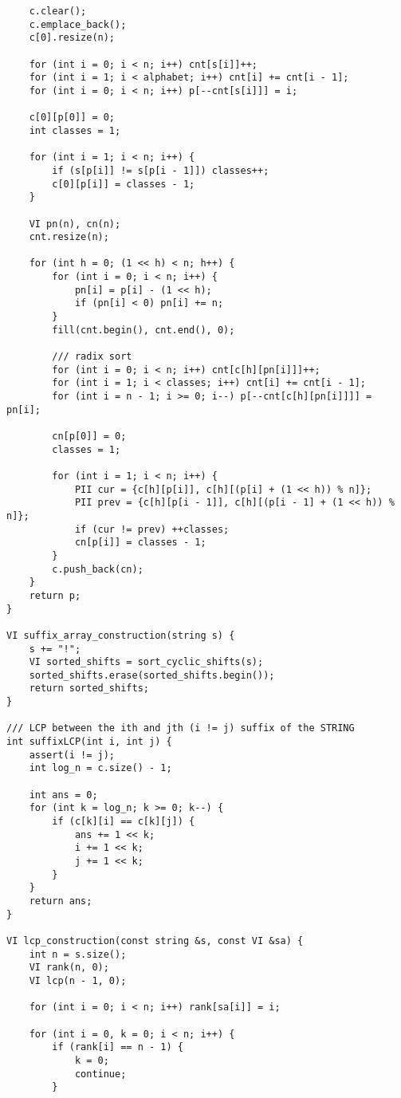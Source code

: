\documentclass[FSZ,a4paper,onesided]{article}
\begin{document}
\begin{multicols*}{\COLS}
\begin{lstlisting}
    c.clear();
    c.emplace_back();
    c[0].resize(n);

    for (int i = 0; i < n; i++) cnt[s[i]]++;
    for (int i = 1; i < alphabet; i++) cnt[i] += cnt[i - 1];
    for (int i = 0; i < n; i++) p[--cnt[s[i]]] = i;

    c[0][p[0]] = 0;
    int classes = 1;

    for (int i = 1; i < n; i++) {
        if (s[p[i]] != s[p[i - 1]]) classes++;
        c[0][p[i]] = classes - 1;
    }

    VI pn(n), cn(n);
    cnt.resize(n);

    for (int h = 0; (1 << h) < n; h++) {
        for (int i = 0; i < n; i++) {
            pn[i] = p[i] - (1 << h);
            if (pn[i] < 0) pn[i] += n;
        }
        fill(cnt.begin(), cnt.end(), 0);

        /// radix sort
        for (int i = 0; i < n; i++) cnt[c[h][pn[i]]]++;
        for (int i = 1; i < classes; i++) cnt[i] += cnt[i - 1];
        for (int i = n - 1; i >= 0; i--) p[--cnt[c[h][pn[i]]]] = pn[i];

        cn[p[0]] = 0;
        classes = 1;

        for (int i = 1; i < n; i++) {
            PII cur = {c[h][p[i]], c[h][(p[i] + (1 << h)) % n]};
            PII prev = {c[h][p[i - 1]], c[h][(p[i - 1] + (1 << h)) % n]};
            if (cur != prev) ++classes;
            cn[p[i]] = classes - 1;
        }
        c.push_back(cn);
    }
    return p;
}

VI suffix_array_construction(string s) {
    s += "!";
    VI sorted_shifts = sort_cyclic_shifts(s);
    sorted_shifts.erase(sorted_shifts.begin());
    return sorted_shifts;
}

/// LCP between the ith and jth (i != j) suffix of the STRING
int suffixLCP(int i, int j) {
    assert(i != j);
    int log_n = c.size() - 1;

    int ans = 0;
    for (int k = log_n; k >= 0; k--) {
        if (c[k][i] == c[k][j]) {
            ans += 1 << k;
            i += 1 << k;
            j += 1 << k;
        }
    }
    return ans;
}

VI lcp_construction(const string &s, const VI &sa) {
    int n = s.size();
    VI rank(n, 0);
    VI lcp(n - 1, 0);

    for (int i = 0; i < n; i++) rank[sa[i]] = i;

    for (int i = 0, k = 0; i < n; i++) {
        if (rank[i] == n - 1) {
            k = 0;
            continue;
        }


\end{lstlisting}
\end{multicols*}
\end{document}
